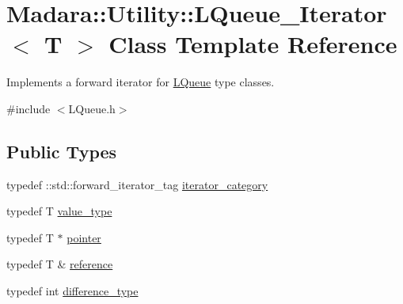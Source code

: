 \hypertarget{classMadara_1_1Utility_1_1LQueue__Iterator}{
\section{Madara::Utility::LQueue\_\-Iterator$<$ T $>$ Class Template Reference}
\label{df/dbb/classMadara_1_1Utility_1_1LQueue__Iterator}
}


Implements a forward iterator for \hyperlink{classMadara_1_1Utility_1_1LQueue}{LQueue} type classes.  




{\ttfamily \#include $<$LQueue.h$>$}

\subsection*{Public Types}
\begin{DoxyCompactItemize}
\item 
typedef ::std::forward\_\-iterator\_\-tag \hyperlink{classMadara_1_1Utility_1_1LQueue__Iterator_a4168516b4826eee61600d72fbc493a9e}{iterator\_\-category}
\item 
typedef T \hyperlink{classMadara_1_1Utility_1_1LQueue__Iterator_ad14a2201e06e7b02176606f10f6bbae5}{value\_\-type}
\item 
typedef T $\ast$ \hyperlink{classMadara_1_1Utility_1_1LQueue__Iterator_ae2af259676274b8d3fb9b4bd22277154}{pointer}
\item 
typedef T \& \hyperlink{classMadara_1_1Utility_1_1LQueue__Iterator_aaf4374375c6d85774b8416200c6aa658}{reference}
\item 
typedef int \hyperlink{classMadara_1_1Utility_1_1LQueue__Iterator_a2cd150570b835cbf73880e080e4d69c3}{difference\_\-type}
\end{DoxyCompactItemize}
